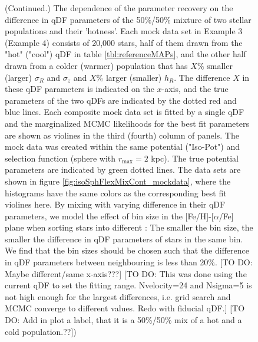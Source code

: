 \addtocounter{figure}{-1}
\begin{figure} [t!]
  \caption{(Continued.) The dependence of the parameter recovery on the difference in qDF parameters of the 50\%/50\% mixture of two stellar populations and their 'hotness'. Each mock data set in Example 3 (Example 4) consists of 20,000 stars, half of them drawn from the "hot" ("cool") qDF in table \ref{tbl:referenceMAPs}, and the other half drawn from a colder (warmer) population that has $X\%$ smaller (larger) $\sigma_R$ and $\sigma_z$ and $X\%$ larger (smaller) $h_R$. The difference $X$ in these qDF parameters is indicated on the $x$-axis, and the true parameters of the two qDFs are indicated by the dotted red and blue lines. Each composite mock data set is fitted by a single qDF and the marginalized MCMC likelihoods for the best fit parameters are shown as violines in the third (fourth) column of panels. The mock data was created within the same potential ("Iso-Pot") and selection function (sphere with $r_\text{max} = 2$ kpc). The true potential parameters are indicated by green dotted lines. The data sets are shown in figure \ref{fig:isoSphFlexMixCont_mockdata}, where the histograms have the same colors as the corresponding best fit violines here. By mixing \MAPs with varying difference in their qDF parameters, we model the effect of bin size in the [Fe/H]-[$\alpha$/Fe] plane when sorting stars into different \MAPs: The smaller the bin size, the smaller the difference in qDF parameters of stars in the same bin. We find that the bin sizes should be chosen such that the difference in qDF parameters between neighbouring \MAPs is less than 20\%.
[TO DO: Maybe different/same x-axis???] [TO DO: This was done using the current qDF to set the fitting range. Nvelocity=24 and Nsigma=5 is not high enough for the largest differences, i.e. grid search and MCMC converge to different values. Redo with fiducial qDF.] [TO DO: Add in plot a label, that it is a 50\%/50\% mix of a hot and a cold population.??])} 
\end{figure}

